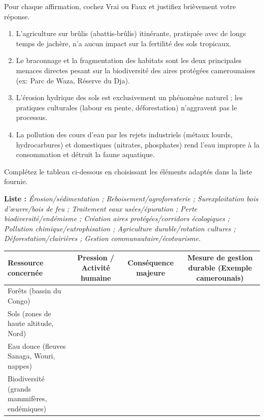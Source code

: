 \documentclass[11pt]{article}
\begin{document}
\begin{exercice}
Pour chaque affirmation, cochez Vrai ou Faux et justifiez brièvement votre réponse.
\begin{enumerate}
    \item L'agriculture sur brûlis (abattis-brûlis) itinérante, pratiquée avec de longs temps de jachère, n'a aucun impact sur la fertilité des sols tropicaux.
    \item Le braconnage et la fragmentation des habitats sont les deux principales menaces directes pesant sur la biodiversité des aires protégées camerounaises (ex: Parc de Waza, Réserve du Dja).
    \item L'érosion hydrique des sols est exclusivement un phénomène naturel ; les pratiques culturales (labour en pente, déforestation) n'aggravent pas le processus.
    \item La pollution des cours d'eau par les rejets industriels (métaux lourds, hydrocarbures) et domestiques (nitrates, phosphates) rend l'eau impropre à la consommation et détruit la faune aquatique.
\end{enumerate}
\end{exercice}

\begin{exercice}
Complétez le tableau ci-dessous en choisissant les éléments adaptés dans la liste fournie.
\medskip

\textbf{Liste :} \textit{Érosion/sédimentation ; Reboisement/agroforesterie ; Surexploitation bois d'œuvre/bois de feu ; Traitement eaux usées/épuration ; Perte biodiversité/endémisme ; Création aires protégées/corridors écologiques ; Pollution chimique/eutrophisation ; Agriculture durable/rotation cultures ; Déforestation/clairières ; Gestion communautaire/écotourisme.}

\begin{tabularx}{\linewidth}{|X|c|c|c|}
\hline
\textbf{Ressource concernée} & \textbf{Pression / Activité humaine} & \textbf{Conséquence majeure} & \textbf{Mesure de gestion durable (Exemple camerounais)} \\
\hline
Forêts (bassin du Congo) & & & \\
\hline
Sols (zones de haute altitude, Nord) & & & \\
\hline
Eau douce (fleuves Sanaga, Wouri, nappes) & & & \\
\hline
Biodiversité (grands mammifères, endémiques) & & & \\
\hline
\end{tabularx}
\end{exercice}
\end{document}
